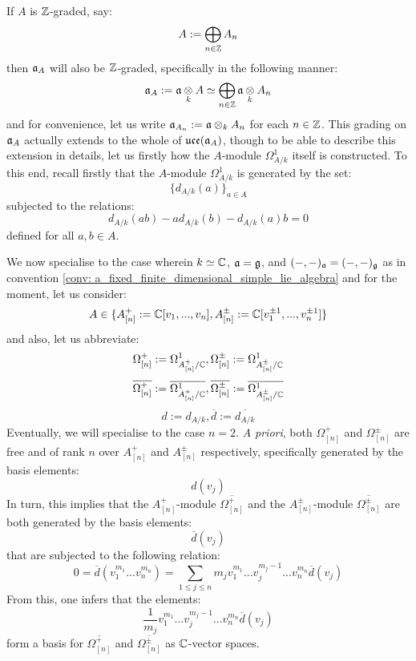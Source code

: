 \begin{remark}
                If $A$ is $\mathbb{Z}$-graded, say:
                    $$A := \bigoplus_{n \in \mathbb{Z}} A_n$$
                then $\mathfrak{a}_A$ will also be $\mathbb{Z}$-graded, specifically in the following manner:
                    $$\a_A := \a \tensor_k A \cong \bigoplus_{n \in \Z} \a \tensor_k A_n$$
                and for convenience, let us write $\a_{A_n} := \a \tensor_k A_n$ for each $n \in \mathbb{Z}$. This grading on $\mathfrak{a}_A$ actually extends to the whole of $\mathfrak{uce}(\mathfrak{a}_A)$, though to be able to describe this extension in details, let us firstly how the $A$-module $\Omega^1_{A/k}$ itself is constructed. To this end, recall firstly that the $A$-module $\Omega^1_{A/k}$ is generated by the set:
                    $$\{d_{A/k}(a)\}_{a \in A}$$
                subjected to the relations:
                    $$d_{A/k}(ab) - a d_{A/k}(b) - d_{A/k}(a) b = 0$$
                defined for all $a, b \in A$. 

                We now specialise to the case wherein $k \simeq \mathbb{C}$, $\mathfrak{a} = \mathfrak{g}$, and $(-, -)_{\mathfrak{a}} = (-, -)_{\mathfrak{g}}$ as in convention \ref{conv: a_fixed_finite_dimensional_simple_lie_algebra} and for the moment, let us consider:
                    $$A \in \{ A_{[n]}^+ := \mathbb{C}[v_1, ..., v_n], A_{[n]}^{\pm} := \mathbb{C}[v_1^{\pm 1}, ..., v_n^{\pm 1}] \}$$
                and also, let us abbreviate:
                    $$\Omega^+_{[n]} := \Omega^1_{A_{[n]}^+/\mathbb{C}}, \Omega^{\pm}_{[n]} := \Omega^1_{A_{[n]}^{\pm}/\mathbb{C}}$$
                    $$\overline{\Omega^+_{[n]}} := \overline{\Omega^1_{A_{[n]}^+/\mathbb{C}}}, \overline{\Omega^{\pm}_{[n]}} := \overline{\Omega^1_{A_{[n]}^{\pm}/\mathbb{C}}}$$
                    $$d := d_{A/k}, \overline{d} := \overline{d_{A/k}}$$
                Eventually, we will specialise to the case $n = 2$. \textit{A priori}, both $\Omega^+_{[n]}$ and $\Omega^{\pm}_{[n]}$ are free and of rank $n$ over $A_{[n]}^+$ and $A_{[n]}^{\pm}$ respectively, specifically generated by the basis elements:
                    $$d(v_j)$$
                In turn, this implies that the $A_{[n]}^+$-module $\overline{\Omega^+_{[n]}}$ and the $A_{[n]}^{\pm}$-module $\overline{\Omega^{\pm}_{[n]}}$ are both generated by the basis elements:
                    $$\overline{d}(v_j)$$
                that are subjected to the following relation:
                    $$0 = \overline{d}( v_1^{m_1} ... v_n^{m_n} ) = \sum_{1 \leq j \leq n} m_j v_1^{m_1} ... v_j^{m_j - 1} ... v_n^{m_n} \overline{d}(v_j)$$
                From this, one infers that the elements:
                    $$\frac{1}{m_j} v_1^{m_1} ... v_j^{m_j - 1} ... v_n^{m_n} \overline{d}(v_j)$$
                form a basis for $\overline{\Omega^+_{[n]}}$ and $\overline{\Omega^{\pm}_{[n]}}$ as $\mathbb{C}$-vector spaces. 


\end{remark}
